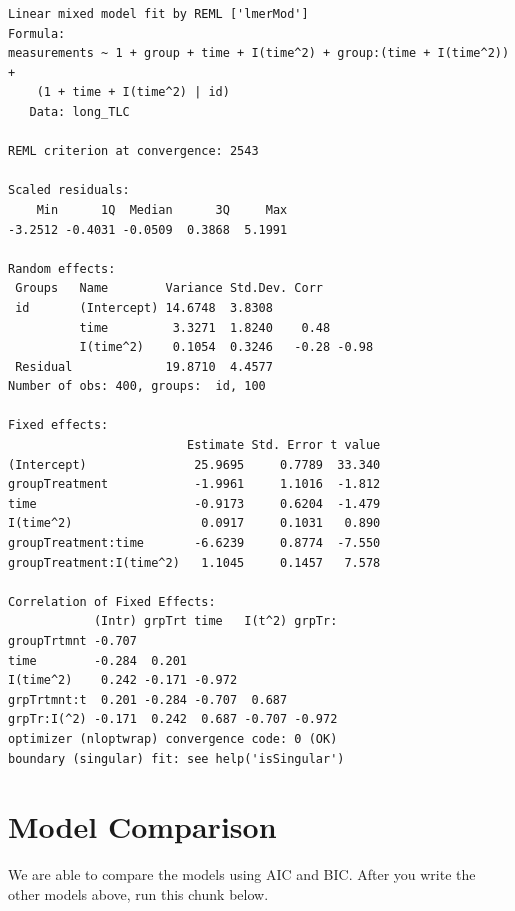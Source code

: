 \documentclass[
  letterpaper,
  DIV=11,
  numbers=noendperiod]{scrreprt}
\begin{document}
\begin{verbatim}
Linear mixed model fit by REML ['lmerMod']
Formula: 
measurements ~ 1 + group + time + I(time^2) + group:(time + I(time^2)) +  
    (1 + time + I(time^2) | id)
   Data: long_TLC

REML criterion at convergence: 2543

Scaled residuals: 
    Min      1Q  Median      3Q     Max 
-3.2512 -0.4031 -0.0509  0.3868  5.1991 

Random effects:
 Groups   Name        Variance Std.Dev. Corr       
 id       (Intercept) 14.6748  3.8308              
          time         3.3271  1.8240    0.48      
          I(time^2)    0.1054  0.3246   -0.28 -0.98
 Residual             19.8710  4.4577              
Number of obs: 400, groups:  id, 100

Fixed effects:
                         Estimate Std. Error t value
(Intercept)               25.9695     0.7789  33.340
groupTreatment            -1.9961     1.1016  -1.812
time                      -0.9173     0.6204  -1.479
I(time^2)                  0.0917     0.1031   0.890
groupTreatment:time       -6.6239     0.8774  -7.550
groupTreatment:I(time^2)   1.1045     0.1457   7.578

Correlation of Fixed Effects:
            (Intr) grpTrt time   I(t^2) grpTr:
groupTrtmnt -0.707                            
time        -0.284  0.201                     
I(time^2)    0.242 -0.171 -0.972              
grpTrtmnt:t  0.201 -0.284 -0.707  0.687       
grpTr:I(^2) -0.171  0.242  0.687 -0.707 -0.972
optimizer (nloptwrap) convergence code: 0 (OK)
boundary (singular) fit: see help('isSingular')
\end{verbatim}

\hypertarget{model-comparison}{%
\section{Model Comparison}\label{model-comparison}}

We are able to compare the models using AIC and BIC. After you write the
other models above, run this chunk below.
\end{document}
